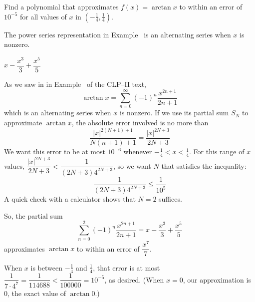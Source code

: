 \begin{question}
Find a polynomial that approximates $f(x)=\arctan x$  to within an error of $10^{-5}$ for all values of $x$ in $\left(-\frac{1}{4},\frac{1}{4}\right)$.
\end{question}
\begin{hint}
The power series representation in Example~ is an alternating series when $x$ is nonzero.
\end{hint}
\begin{answer}
$x-\dfrac{x^3}{3}+\dfrac{x^5}{5}$
\end{answer}
\begin{solution}
As we saw in in Example~  of the CLP--II text,
\[\arctan x = \sum_{n=0}^\infty (-1)^n\frac{x^{2n+1}}{2n+1}\]
which is an alternating series when $x$ is nonzero. If we use its partial sum $S_N$ to approximate $\arctan x$, the absolute error involved is no more than
 \[\frac{|x|^{2(N+1)+1}}{N(n+1)+1} =\frac{|x|^{2N+3}}{2N+3}\]
 We want this error to be at most $10^{-6}$ whenever $-\frac14< x <\frac14$. For this range of $x$ values,
$ \dfrac{|x|^{2N+3}}{2N+3}<\dfrac{1}{(2N+3)4^{2N+3}}$, so we want $N$ that satisfies the  inequality:
\[
\frac{1}{(2N+3)4^{2N+3}}\le \frac{1}{10^5}
\]
A quick check with a calculator shows that $N=2$ suffices.

So, the partial sum
\[ \sum_{n=0}^2 (-1)^n\frac{x^{2n+1}}{2n+1}=x-\frac{x^3}{3}+\frac{x^5}{5}\]
approximates $\arctan x$ to within an error of
$\dfrac{x^7}{7}$.

When $x$ is between $-\frac14$ and $\frac14$,
that error is at most $\dfrac{1}{7\cdot 4^7}=\dfrac{1}{114688}<\dfrac{1}{100000}=10^{-5}$, as desired. (When $x=0$, our approximation is 0, the exact value of $\arctan 0$.)

\end{solution}
